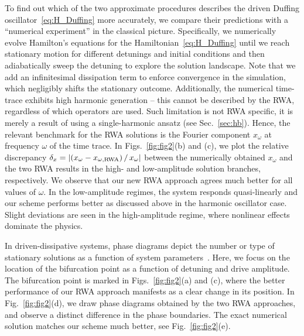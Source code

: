 To find out which of the two approximate procedures describes the driven Duffing oscillator~\eqref{eq:H_Duffing} more accurately, we compare their predictions with a ``numerical experiment'' in the classical picture. Specifically, we numerically evolve Hamilton's equations for the Hamiltonian~\eqref{eq:H_Duffing} until we reach stationary motion for different detunings and initial conditions and then adiabatically sweep the detuning to explore the solution landscape. Note that we add an infinitesimal dissipation term to enforce convergence in the simulation, which negligibly shifts the stationary outcome. 
Additionally, the numerical time-trace exhibits high harmonic generation -- this cannot be described by the RWA, regardless of which operators are used. Such limitation is not RWA specific, it is merely a result of using a single-harmonic ansatz (see Sec.~\ref{sec:hb}). Hence, the relevant benchmark for the RWA solutions is the Fourier component $x_\omega$ at frequency $\omega$ of the time trace. In Figs.~\ref{fig:fig2}(b) and (c), we plot the relative discrepancy $\delta_x = \abs{(x_\omega - x_{\omega, \text{RWA}})\, /\, x_\omega}$ between the numerically obtained $x_\omega$ and the two RWA results in the high- and low-amplitude solution branches, respectively. We observe that our new RWA approach agrees much better for all values of $\omega$. In the low-amplitude regimes, the system responds quasi-linearly and our scheme performs better as discussed above in the harmonic oscillator case. Slight deviations are seen in the high-amplitude regime, where nonlinear effects dominate the physics.

In driven-dissipative systems, phase diagrams depict the number or type of stationary solutions as a function of system parameters~\cite{Soriente_2018, Chitra_2015}. Here, we focus on the location of the bifurcation point as a function of detuning and drive amplitude.
The bifurcation point is marked in Figs.~\ref{fig:fig2}(a) and (c), where the better performance of our RWA approach manifests as a clear change in its position. In Fig.~\ref{fig:fig2}(d), we draw phase diagrams obtained by the two RWA approaches, and observe a distinct difference in the phase boundaries. The exact numerical solution matches our scheme much better, see Fig.~\ref{fig:fig2}(e).


